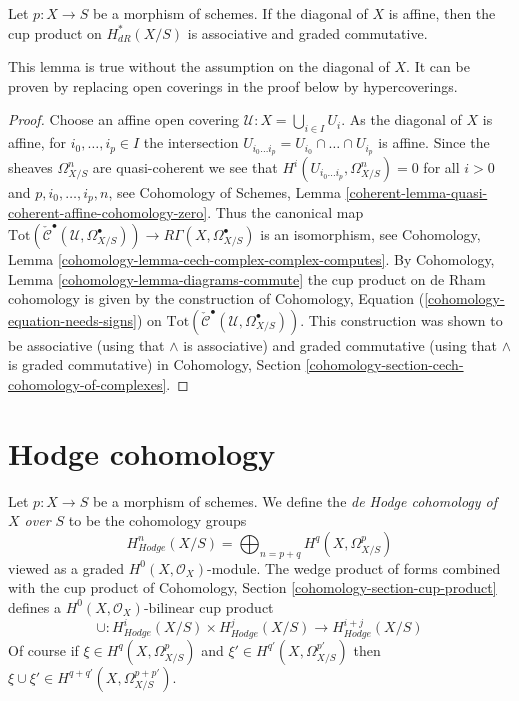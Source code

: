 \begin{lemma}
\label{lemma-cup-product-graded-commutative}
Let $p : X \to S$ be a morphism of schemes. If the diagonal of $X$ is
affine, then the cup product on $H^*_{dR}(X/S)$ is associative and
graded commutative.
\end{lemma}

\noindent
This lemma is true without the assumption on the diagonal of $X$.
It can be proven by replacing open coverings in the proof below
by hypercoverings.

\begin{proof}
Choose an affine open covering $\mathcal{U} : X = \bigcup_{i \in I} U_i$.
As the diagonal of $X$ is affine, for $i_0, \ldots, i_p \in I$
the intersection $U_{i_0 \ldots i_p} = U_{i_0} \cap \ldots \cap U_{i_p}$
is affine. Since the sheaves $\Omega^n_{X/S}$ are quasi-coherent we see that
$H^i(U_{i_0 \ldots i_p}, \Omega^n_{X/S}) = 0$ for all $i > 0$
and $p, i_0, \ldots, i_p, n$, see
Cohomology of Schemes, Lemma
\ref{coherent-lemma-quasi-coherent-affine-cohomology-zero}.
Thus the canonical map
$\text{Tot}(\check{\mathcal{C}}^\bullet(\mathcal{U}, \Omega_{X/S}^\bullet))
\to R\Gamma(X, \Omega_{X/S}^\bullet)$ is an isomorphism, see
Cohomology, Lemma \ref{cohomology-lemma-cech-complex-complex-computes}.
By Cohomology, Lemma \ref{cohomology-lemma-diagrams-commute}
the cup product on de Rham cohomology is given by the construction
of Cohomology, Equation (\ref{cohomology-equation-needs-signs}) on
$\text{Tot}(\check{\mathcal{C}}^\bullet(\mathcal{U}, \Omega_{X/S}^\bullet))$.
This construction was shown to be associative (using that $\wedge$
is associative) and graded commutative
(using that $\wedge$ is graded commutative) in
Cohomology, Section \ref{cohomology-section-cech-cohomology-of-complexes}.
\end{proof}






\section{Hodge cohomology}
\label{section-hodge-cohomology}

\noindent
Let $p : X \to S$ be a morphism of schemes. We define the
{\it de Hodge cohomology of $X$ over $S$} to be the cohomology groups
$$
H^n_{Hodge}(X/S) = \bigoplus\nolimits_{n = p + q} H^q(X, \Omega^p_{X/S})
$$
viewed as a graded $H^0(X, \mathcal{O}_X)$-module. The wedge product
of forms combined with the cup product of
Cohomology, Section \ref{cohomology-section-cup-product}
defines a $H^0(X, \mathcal{O}_X)$-bilinear cup product
$$
\cup :
H^i_{Hodge}(X/S) \times H^j_{Hodge}(X/S)
\longrightarrow
H^{i + j}_{Hodge}(X/S)
$$
Of course if  $\xi \in H^q(X, \Omega^p_{X/S})$ and
$\xi' \in H^{q'}(X, \Omega^{p'}_{X/S})$ then $\xi \cup \xi' \in
H^{q + q'}(X, \Omega^{p + p'}_{X/S})$.


